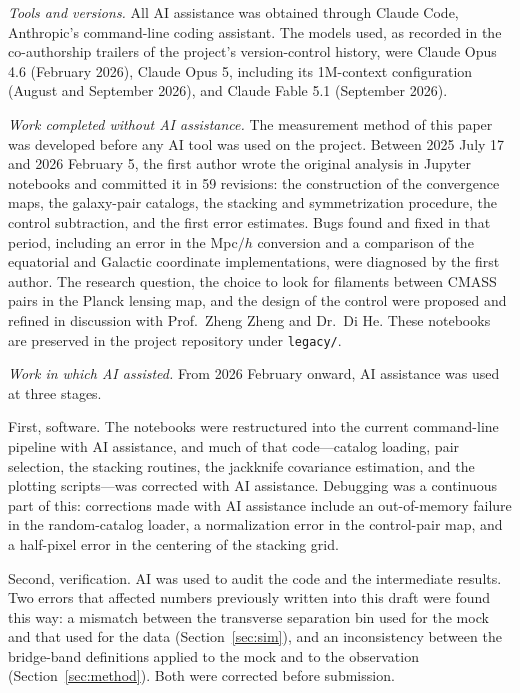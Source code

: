 \begin{acknowledgments}
\emph{Tools and versions.} All AI assistance was obtained through Claude Code,
Anthropic's command-line coding assistant. The models used, as recorded in the
co-authorship trailers of the project's version-control history, were Claude
Opus 4.6 (February 2026), Claude Opus 5, including its 1M-context configuration
(August and September 2026), and Claude Fable 5.1 (September 2026).

\emph{Work completed without AI assistance.} The measurement method of this
paper was developed before any AI tool was used on the project. Between
2025 July 17 and 2026 February 5, the first author wrote the original analysis
in Jupyter notebooks and committed it in 59 revisions: the construction of the
convergence maps, the galaxy-pair catalogs, the stacking and symmetrization
procedure, the control subtraction, and the first error estimates. Bugs found
and fixed in that period, including an error in the Mpc$/h$ conversion and a
comparison of the equatorial and Galactic coordinate implementations, were
diagnosed by the first author. The research question, the choice to look for
filaments between CMASS pairs in the Planck lensing map, and the design of the
control were proposed and refined in discussion with Prof.\ Zheng Zheng and
Dr.\ Di He. These notebooks are preserved in the project repository under
\texttt{legacy/}.

\emph{Work in which AI assisted.} From 2026 February onward, AI assistance was
used at three stages.

First, software. The notebooks were restructured into the current command-line
pipeline with AI assistance, and much of that code---catalog loading, pair
selection, the stacking routines, the jackknife covariance estimation, and the
plotting scripts---was corrected with AI assistance. Debugging was a continuous
part of this: corrections made with AI assistance include an out-of-memory failure
in the random-catalog loader, a normalization error in the control-pair map, and a
half-pixel error in the centering of the stacking grid.

Second, verification. AI was used to audit the code and the intermediate
results. Two errors that affected numbers previously written into this draft
were found this way: a mismatch between the transverse separation bin used for
the mock and that used for the data (Section~\ref{sec:sim}), and an
inconsistency between the bridge-band definitions applied to the mock and to
the observation (Section~\ref{sec:method}). Both were corrected before
submission.


\end{acknowledgments}
